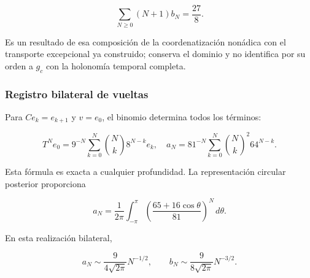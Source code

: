 \begin{equation}
\sum_{N\geq0}(N+1)b_N=\frac{27}{8}.
\label{nuc03:eq:17}
\end{equation}

Es un resultado de esa composición de la coordenatización nonádica con el transporte excepcional ya construido; conserva el dominio y no identifica por su orden a \(g_c\) con la holonomía temporal completa.

\subsubsection{Registro bilateral de vueltas}

Para \(C e_k=e_{k+1}\) y \(v=e_0\), el binomio determina todos los términos:

\begin{equation}
T^Ne_0=9^{-N}\sum_{k=0}^{N}\binom{N}{k}8^{N-k}e_k,
\quad
a_N=81^{-N}\sum_{k=0}^{N}\binom{N}{k}^{\!2}64^{N-k}.
\label{nuc03:eq:18}
\end{equation}

Esta fórmula es exacta a cualquier profundidad. La representación circular posterior proporciona

\begin{equation}
a_N=\frac1{2\pi}\int_{-\pi}^{\pi}
\left(\frac{65+16\cos\theta}{81}\right)^N\,d\theta.
\label{nuc03:eq:19}
\end{equation}

\begin{theorem}
En esta realización bilateral,

\begin{equation}
\boxed{a_N\sim\frac9{4\sqrt{2\pi}}N^{-1/2},\qquad
b_N\sim\frac9{8\sqrt{2\pi}}N^{-3/2}.}
\label{nuc03:eq:20}
\end{equation}
\end{theorem}


